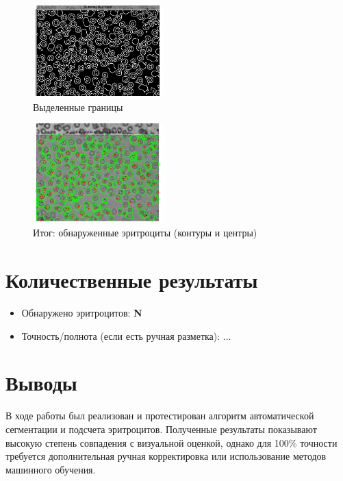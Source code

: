 \documentclass[12pt,a4paper]{article}
\begin{document}
\begin{figure}[H]
    \centering
    \includegraphics[width=0.45\textwidth]{edges.png}
    \caption{Выделенные границы}
\end{figure}

\begin{figure}[H]
    \centering
    \includegraphics[width=0.45\textwidth]{result.png}
    \caption{Итог: обнаруженные эритроциты (контуры и центры)}
\end{figure}

\section*{Количественные результаты}

\begin{itemize}
    \item Обнаружено эритроцитов: \textbf{N}
    \item Точность/полнота (если есть ручная разметка): ...
\end{itemize}

\section*{Выводы}

В ходе работы был реализован и протестирован алгоритм автоматической сегментации и подсчета эритроцитов. Полученные результаты показывают высокую степень совпадения с визуальной оценкой, однако для 100\% точности требуется дополнительная ручная корректировка или использование методов машинного обучения.
\end{document}
